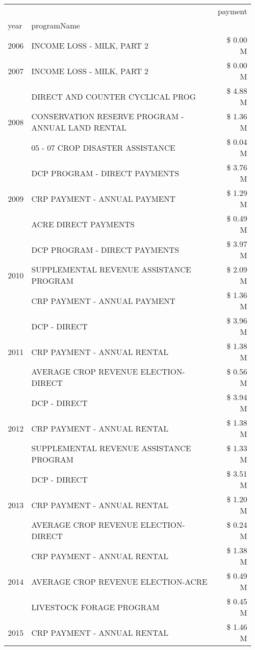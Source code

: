 \begin{tabular}{llr}
\toprule
 &  & payment \\
year & programName &  \\
\midrule
2006 & INCOME LOSS - MILK, PART 2 & \$ 0.00 M \\
\cline{1-3}
2007 & INCOME LOSS - MILK, PART 2 & \$ 0.00 M \\
\cline{1-3}
\multirow[t]{3}{*}{2008} & DIRECT AND COUNTER CYCLICAL PROG & \$ 4.88 M \\
 & CONSERVATION RESERVE PROGRAM - ANNUAL LAND RENTAL & \$ 1.36 M \\
 & 05 - 07 CROP DISASTER ASSISTANCE & \$ 0.04 M \\
\cline{1-3}
\multirow[t]{3}{*}{2009} & DCP PROGRAM - DIRECT PAYMENTS & \$ 3.76 M \\
 & CRP PAYMENT - ANNUAL PAYMENT & \$ 1.29 M \\
 & ACRE DIRECT PAYMENTS & \$ 0.49 M \\
\cline{1-3}
\multirow[t]{3}{*}{2010} & DCP PROGRAM - DIRECT PAYMENTS & \$ 3.97 M \\
 & SUPPLEMENTAL REVENUE ASSISTANCE PROGRAM & \$ 2.09 M \\
 & CRP PAYMENT - ANNUAL PAYMENT & \$ 1.36 M \\
\cline{1-3}
\multirow[t]{3}{*}{2011} & DCP - DIRECT & \$ 3.96 M \\
 & CRP PAYMENT - ANNUAL RENTAL & \$ 1.38 M \\
 & AVERAGE CROP REVENUE ELECTION-DIRECT & \$ 0.56 M \\
\cline{1-3}
\multirow[t]{3}{*}{2012} & DCP - DIRECT & \$ 3.94 M \\
 & CRP PAYMENT - ANNUAL RENTAL & \$ 1.38 M \\
 & SUPPLEMENTAL REVENUE ASSISTANCE PROGRAM & \$ 1.33 M \\
\cline{1-3}
\multirow[t]{3}{*}{2013} & DCP - DIRECT & \$ 3.51 M \\
 & CRP PAYMENT - ANNUAL RENTAL & \$ 1.20 M \\
 & AVERAGE CROP REVENUE ELECTION-DIRECT & \$ 0.24 M \\
\cline{1-3}
\multirow[t]{3}{*}{2014} & CRP PAYMENT - ANNUAL RENTAL & \$ 1.38 M \\
 & AVERAGE CROP REVENUE ELECTION-ACRE & \$ 0.49 M \\
 & LIVESTOCK FORAGE PROGRAM & \$ 0.45 M \\
\cline{1-3}
\multirow[t]{3}{*}{2015} & CRP PAYMENT - ANNUAL RENTAL & \$ 1.46 M \\

\end{tabular}
